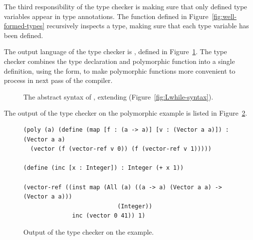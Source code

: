 \documentclass[7x10,nocrop]{TimesAPriori_MIT}%
\newcommand{\gray}[1]{{\color{gray} #1}}
\begin{document}
The third responsibility of the type checker is making sure that only
defined type variables appear in type annotations. The
 function defined in
Figure~\ref{fig:well-formed-types} recursively inspects a type, making
sure that each type variable has been defined.

The output language of the type checker is \LangInst{}, defined in
Figure~\ref{fig:Rpoly-prime-syntax}. The type checker combines the type
declaration and polymorphic function into a single definition, using
the  form, to make polymorphic functions more convenient to
process in next pass of the compiler.

\begin{figure}[tp]
\centering
\fbox{
  \begin{minipage}{0.96\textwidth}
\small
\[
\begin{array}{lcl}
  \Type &::=& \ldots \MID \LP\key{All}~\LP\Var\ldots\RP~ \Type\RP \MID \Var \\
  \Exp &::=& \ldots \MID \INST{\Exp}{\Type}{\LP\Type\ldots\RP} \\
  \Def &::=& \gray{ \DEF{\Var}{\LP\LS\Var \key{:} \Type\RS \ldots\RP}{\Type}{\code{'()}}{\Exp} } \\
   &\MID& \LP\key{Poly}~\LP\Var\ldots\RP~ \DEF{\Var}{\LP\LS\Var \key{:} \Type\RS \ldots\RP}{\Type}{\code{'()}}{\Exp}\RP  \\
  \LangInst{} &::=& \gray{ \PROGRAMDEFSEXP{\code{'()}}{\LP\Def\ldots\RP}{\Exp} }
\end{array}
\]
\end{minipage}
}
\caption{The abstract syntax of \LangInst{}, extending \LangLoop{}
    (Figure~\ref{fig:Lwhile-syntax}).}
\label{fig:Rpoly-prime-syntax}
\end{figure}

The output of the type checker on the polymorphic 
example is listed in Figure~\ref{fig:map-type-check}.

\begin{figure}[tbp]
\begin{lstlisting}
(poly (a) (define (map [f : (a -> a)] [v : (Vector a a)]) : (Vector a a)
  (vector (f (vector-ref v 0)) (f (vector-ref v 1)))))

(define (inc [x : Integer]) : Integer (+ x 1))

(vector-ref ((inst map (All (a) ((a -> a) (Vector a a) -> (Vector a a)))
                           (Integer))
              inc (vector 0 41)) 1)
\end{lstlisting}
\caption{Output of the type checker on the  example.}
\label{fig:map-type-check}
\end{figure}
\end{document}
